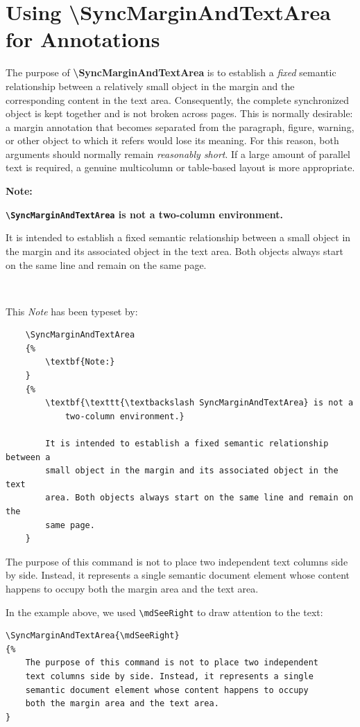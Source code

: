 \documentclass[
11pt,
a4paper,
oneside
]{scrbook}
\begin{document}
{\section{Using \textbackslash SyncMarginAndTextArea for Annotations}

The purpose of \textbf{\textbackslash SyncMarginAndTextArea} is to establish a \emph{fixed} semantic relationship
between a relatively small object in the margin and the corresponding
content in the text area.
Consequently, the complete synchronized object is kept together and is
not broken across pages. This is normally desirable: a margin annotation
that becomes separated from the paragraph, figure, warning, or other
object to which it refers would lose its meaning.
For this reason, both arguments should normally remain \emph{reasonably short}.
If a large amount of parallel text is required, a genuine multicolumn or
table-based layout is more appropriate.

\SyncMarginAndTextArea
{%
	\textbf{Note:}
}
{%
	\textbf{\texttt{\textbackslash SyncMarginAndTextArea} is not a
		two-column environment.}
	
	It is intended to establish a fixed semantic relationship between a
	small object in the margin and its associated object in the text
	area. Both objects always start on the same line and remain on the
	same page.
}

\ %

\noindent This \emph{Note} has been typeset by:
\begin{verbatim}
	\SyncMarginAndTextArea
	{%
		\textbf{Note:}
	}
	{%
		\textbf{\texttt{\textbackslash SyncMarginAndTextArea} is not a
			two-column environment.}
		
		It is intended to establish a fixed semantic relationship between a
		small object in the margin and its associated object in the text
		area. Both objects always start on the same line and remain on the
		same page.
	}
\end{verbatim}

 
\SyncMarginAndTextArea{\mdSeeRight}
{%
	The purpose of this command is not to place two independent 
	text columns side by side. Instead, it represents a single 
	semantic document element whose content happens to occupy 
	both the margin area and the text area.
}
\ %

\noindent In the example above, we used \verb|\mdSeeRight| to draw attention to the text:
\begin{verbatim}
\SyncMarginAndTextArea{\mdSeeRight}
{%
	The purpose of this command is not to place two independent 
	text columns side by side. Instead, it represents a single 
	semantic document element whose content happens to occupy 
	both the margin area and the text area.
}
\end{verbatim}
 
}
\end{document}
